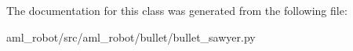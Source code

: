 The documentation for this class was generated from the following file\-:\begin{DoxyCompactItemize}
\item 
aml\-\_\-robot/src/aml\-\_\-robot/bullet/bullet\-\_\-sawyer.\-py\end{DoxyCompactItemize}
